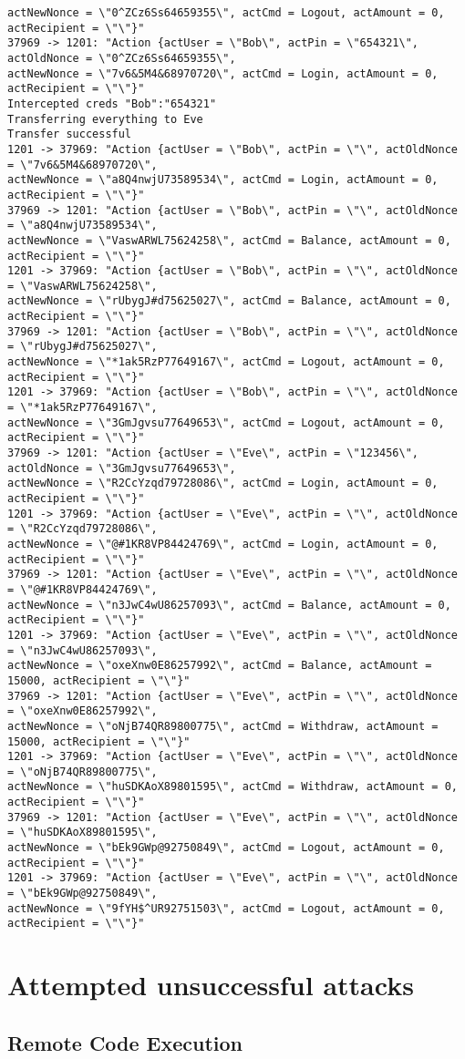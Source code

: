 \documentclass[12pt]{article}
\begin{document}
\begin{Verbatim}[frame=single,fontsize=\scriptsize]
actNewNonce = \"0^ZCz6Ss64659355\", actCmd = Logout, actAmount = 0, actRecipient = \"\"}"
37969 -> 1201: "Action {actUser = \"Bob\", actPin = \"654321\", actOldNonce = \"0^ZCz6Ss64659355\", 
actNewNonce = \"7v6&5M4&68970720\", actCmd = Login, actAmount = 0, actRecipient = \"\"}"
Intercepted creds "Bob":"654321"
Transferring everything to Eve
Transfer successful
1201 -> 37969: "Action {actUser = \"Bob\", actPin = \"\", actOldNonce = \"7v6&5M4&68970720\", 
actNewNonce = \"a8Q4nwjU73589534\", actCmd = Login, actAmount = 0, actRecipient = \"\"}"
37969 -> 1201: "Action {actUser = \"Bob\", actPin = \"\", actOldNonce = \"a8Q4nwjU73589534\", 
actNewNonce = \"VaswARWL75624258\", actCmd = Balance, actAmount = 0, actRecipient = \"\"}"
1201 -> 37969: "Action {actUser = \"Bob\", actPin = \"\", actOldNonce = \"VaswARWL75624258\", 
actNewNonce = \"rUbygJ#d75625027\", actCmd = Balance, actAmount = 0, actRecipient = \"\"}"
37969 -> 1201: "Action {actUser = \"Bob\", actPin = \"\", actOldNonce = \"rUbygJ#d75625027\", 
actNewNonce = \"*1ak5RzP77649167\", actCmd = Logout, actAmount = 0, actRecipient = \"\"}"
1201 -> 37969: "Action {actUser = \"Bob\", actPin = \"\", actOldNonce = \"*1ak5RzP77649167\", 
actNewNonce = \"3GmJgvsu77649653\", actCmd = Logout, actAmount = 0, actRecipient = \"\"}"
37969 -> 1201: "Action {actUser = \"Eve\", actPin = \"123456\", actOldNonce = \"3GmJgvsu77649653\", 
actNewNonce = \"R2CcYzqd79728086\", actCmd = Login, actAmount = 0, actRecipient = \"\"}"
1201 -> 37969: "Action {actUser = \"Eve\", actPin = \"\", actOldNonce = \"R2CcYzqd79728086\", 
actNewNonce = \"@#1KR8VP84424769\", actCmd = Login, actAmount = 0, actRecipient = \"\"}"
37969 -> 1201: "Action {actUser = \"Eve\", actPin = \"\", actOldNonce = \"@#1KR8VP84424769\", 
actNewNonce = \"n3JwC4wU86257093\", actCmd = Balance, actAmount = 0, actRecipient = \"\"}"
1201 -> 37969: "Action {actUser = \"Eve\", actPin = \"\", actOldNonce = \"n3JwC4wU86257093\", 
actNewNonce = \"oxeXnw0E86257992\", actCmd = Balance, actAmount = 15000, actRecipient = \"\"}"
37969 -> 1201: "Action {actUser = \"Eve\", actPin = \"\", actOldNonce = \"oxeXnw0E86257992\", 
actNewNonce = \"oNjB74QR89800775\", actCmd = Withdraw, actAmount = 15000, actRecipient = \"\"}"
1201 -> 37969: "Action {actUser = \"Eve\", actPin = \"\", actOldNonce = \"oNjB74QR89800775\", 
actNewNonce = \"huSDKAoX89801595\", actCmd = Withdraw, actAmount = 0, actRecipient = \"\"}"
37969 -> 1201: "Action {actUser = \"Eve\", actPin = \"\", actOldNonce = \"huSDKAoX89801595\", 
actNewNonce = \"bEk9GWp@92750849\", actCmd = Logout, actAmount = 0, actRecipient = \"\"}"
1201 -> 37969: "Action {actUser = \"Eve\", actPin = \"\", actOldNonce = \"bEk9GWp@92750849\", 
actNewNonce = \"9fYH$^UR92751503\", actCmd = Logout, actAmount = 0, actRecipient = \"\"}"
\end{Verbatim}
\section*{Attempted unsuccessful attacks}
\subsection*{Remote Code Execution}
\end{document}
